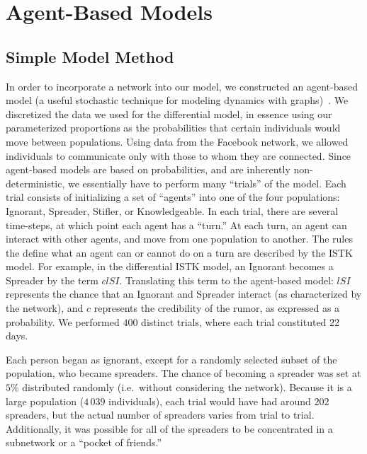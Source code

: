 \section{Agent-Based Models}
\label{sec:abmodel}

\subsection{Simple Model Method}
\label{subsec:abmodelsetup}

\noindent In order to incorporate a network into our model, we constructed an agent-based model (a useful stochastic technique for modeling dynamics with graphs)~\cite{snijders-2010}.
We discretized the data we used for the differential model, in essence using our parameterized proportions as the probabilities that certain individuals would move between populations.
Using data from the Facebook network, we allowed individuals to communicate only with those to whom they are connected.
Since agent-based models are based on probabilities, and are inherently non-deterministic, we essentially have to perform many ``trials'' of the model.
Each trial consists of initializing a set of ``agents'' into one of the four populations: Ignorant, Spreader, Stifler, or Knowledgeable.
In each trial, there are several time-steps, at which point each agent has a ``turn.''
At each turn, an agent can interact with other agents, and move from one population to another.
The rules the define what an agent can or cannot do on a turn are described by the ISTK model.
For example, in the differential ISTK model, an Ignorant becomes a Spreader by the term $ clSI $.
Translating this term to the agent-based model: $ lSI $ represents the chance that an Ignorant and Spreader interact (as characterized by the network), and $ c $ represents the credibility of the rumor, as expressed as a probability.
We performed $ 400 $ distinct trials, where each trial constituted $ 22 $ days.

Each person began as ignorant, except for a randomly selected subset of the population, who became spreaders.
The chance of becoming a spreader was set at $ 5\% $ distributed randomly (i.e.\ without considering the network).
Because it is a large population ($ 4\,039 $ individuals), each trial would have had around $ 202 $ spreaders, but the actual number of spreaders varies from trial to trial.
Additionally, it was possible for all of the spreaders to be concentrated in a subnetwork or a ``pocket of friends.''

